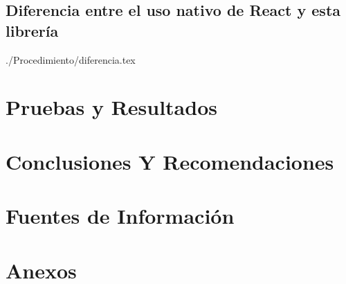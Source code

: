 \documentclass[a4paper,12pt, listof=totoc]{report}
\begin{document}
			\section {Diferencia entre el uso nativo de React y esta librería}
				 {./Procedimiento/diferencia.tex}
			
		
		\chapter {Pruebas y Resultados}
			
		
		\chapter {Conclusiones Y Recomendaciones}
			
		
		\chapter {Fuentes de Información}
			
			
		\chapter {Anexos}
\end{document}
